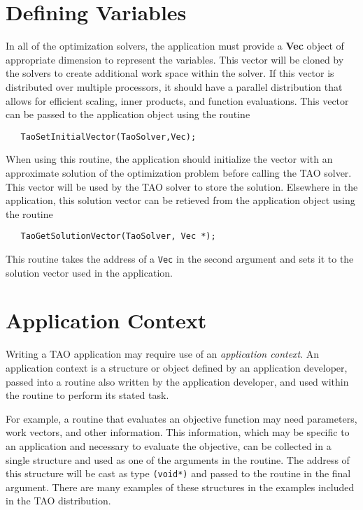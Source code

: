 \section{Defining Variables}
In all of the optimization solvers, the application must provide
a {\bf Vec} object of appropriate dimension to represent the variables.
This vector will be cloned by the solvers to create additional work
space within the solver.
If this vector is distributed over multiple processors, it
should have a parallel distribution that allows
for efficient scaling, inner products, and
function evaluations.  This vector can be passed to the
application object using the routine 
\begin{verbatim}
   TaoSetInitialVector(TaoSolver,Vec);
\end{verbatim}
When using this routine, the application should initialize the vector with
an approximate solution of the optimization problem before calling the
TAO solver.
This vector will be used by the TAO solver to store the solution.
Elsewhere in the application, 
this solution vector can be retieved from the application object 
using the routine 
\begin{verbatim}
   TaoGetSolutionVector(TaoSolver, Vec *);
\end{verbatim}
This routine takes the address of a {\tt Vec} in the second argument and sets it to
the solution vector used in the application.

\section{Application Context}  
Writing a TAO application may require
use of an {\em application context}.
An application context is a structure or object defined by an
application developer, passed
into a routine also written by the application developer, 
and used within the routine to perform its stated task.
 
For example, a routine that evaluates an objective function may need
parameters, work vectors, and other information.   This information,
which may be specific to an application and necessary to evaluate the objective,
can be collected in a single structure and used as one of the
arguments in the routine.
The address of this structure will be cast as type {\tt (void*)} and passed to
the routine in the final argument.
There are many examples of these structures in the examples included in the
TAO distribution.

